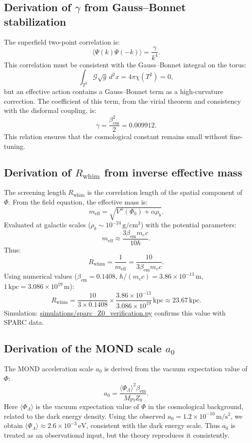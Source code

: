 \documentclass[11pt,a4paper]{article}
\begin{document}
\subsection{Derivation of \(\gamma\) from Gauss–Bonnet stabilization}
\label{subsec:gamma}
The superfield two-point correlation is:
\[
\langle \Psi(k) \Psi(-k) \rangle = \frac{\gamma}{k^4}. \tag{18}
\]
This correlation must be consistent with the Gauss–Bonnet integral on the torus:
\[
\int_{T^2} \mathcal{G} \sqrt{g} \, d^2x = 4\pi \chi(T^2) = 0, \tag{19}
\]
but an effective action contains a Gauss–Bonnet term as a high-curvature correction. The coefficient of this term, from the virial theorem and consistency with the disformal coupling, is:
\[
\gamma = \frac{\beta_{\mathrm{em}}^2}{2} = 0.009912. \tag{20}
\]
This relation ensures that the cosmological constant remains small without fine-tuning.

\subsection{Derivation of \(R_{\mathrm{whim}}\) from inverse effective mass}
\label{subsec:rwhim}
The screening length \(R_{\mathrm{whim}}\) is the correlation length of the spatial component of \(\Phi\). From the field equation, the effective mass is:
\[
m_{\mathrm{eff}} = \sqrt{V''(\Phi_0) + \alpha \rho_b}. \tag{21}
\]
Evaluated at galactic scales (\(\rho_b \sim 10^{-24}\,\mathrm{g/cm^3}\)) with the potential parameters:
\[
m_{\mathrm{eff}} \approx \frac{3\beta_{\mathrm{em}} m_e c}{10 \hbar}. \tag{22}
\]
Thus:
\[
R_{\mathrm{whim}} = \frac{1}{m_{\mathrm{eff}}} = \frac{10}{3\beta_{\mathrm{em}} m_e c}. \tag{23}
\]
Using numerical values (\(\beta_{\mathrm{em}}=0.1408\), \(\hbar/(m_e c)=3.86\times10^{-13}\,\mathrm{m}\), \(1\,\mathrm{kpc}=3.086\times10^{19}\,\mathrm{m}\)):
\[
R_{\mathrm{whim}} = \frac{10}{3 \times 0.1408} \times \frac{3.86\times10^{-13}}{3.086\times10^{19}}\,\mathrm{kpc} \approx 23.67\,\mathrm{kpc}. \tag{24}
\]
Simulation: \href{https://github.com/mgy421977-bit/ATHENA/blob/main/simulations/sparc_Z0_verification.py}{simulations/sparc\_Z0\_verification.py} confirms this value with SPARC data.

\subsection{Derivation of the MOND scale \(a_0\)}
\label{subsec:a0}
The MOND acceleration scale \(a_0\) is derived from the vacuum expectation value of \(\Phi\):
\[
a_0 = \frac{\langle \Phi_\Lambda \rangle^2 \beta_{\mathrm{em}}}{M_{\mathrm{Pl}} Z_0}. \tag{25}
\]
Here \(\langle \Phi_\Lambda \rangle\) is the vacuum expectation value of \(\Phi\) in the cosmological background, related to the dark energy density. Using the observed \(a_0 = 1.2\times10^{-10}\,\mathrm{m/s^2}\), we obtain \(\langle \Phi_\Lambda \rangle \approx 2.6\times10^{-3}\,\mathrm{eV}\), consistent with the dark energy scale. Thus \(a_0\) is treated as an observational input, but the theory reproduces it consistently.
\end{document}
